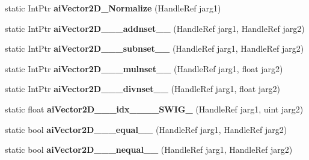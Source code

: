 \begin{DoxyCompactItemize}
\item 
\hypertarget{class_assimp_p_i_n_v_o_k_e_a921e98db8a531252fbb506358869beec}{static Int\+Ptr {\bfseries ai\+Vector2\+D\+\_\+\+Normalize} (Handle\+Ref jarg1)}\label{class_assimp_p_i_n_v_o_k_e_a921e98db8a531252fbb506358869beec}

\item 
\hypertarget{class_assimp_p_i_n_v_o_k_e_a347e7406c1f1c98d45b0b2af2e3e05f1}{static Int\+Ptr {\bfseries ai\+Vector2\+D\+\_\+\+\_\+\+\_\+addnset\+\_\+\+\_\+} (Handle\+Ref jarg1, Handle\+Ref jarg2)}\label{class_assimp_p_i_n_v_o_k_e_a347e7406c1f1c98d45b0b2af2e3e05f1}

\item 
\hypertarget{class_assimp_p_i_n_v_o_k_e_a69be9a8f164752109556509a65fe8ef9}{static Int\+Ptr {\bfseries ai\+Vector2\+D\+\_\+\+\_\+\+\_\+subnset\+\_\+\+\_\+} (Handle\+Ref jarg1, Handle\+Ref jarg2)}\label{class_assimp_p_i_n_v_o_k_e_a69be9a8f164752109556509a65fe8ef9}

\item 
\hypertarget{class_assimp_p_i_n_v_o_k_e_aa0d6b2d94c76055c7ab5f18c5799209b}{static Int\+Ptr {\bfseries ai\+Vector2\+D\+\_\+\+\_\+\+\_\+mulnset\+\_\+\+\_\+} (Handle\+Ref jarg1, float jarg2)}\label{class_assimp_p_i_n_v_o_k_e_aa0d6b2d94c76055c7ab5f18c5799209b}

\item 
\hypertarget{class_assimp_p_i_n_v_o_k_e_a3b2bbec76775745b7782106c26bb8c3f}{static Int\+Ptr {\bfseries ai\+Vector2\+D\+\_\+\+\_\+\+\_\+divnset\+\_\+\+\_\+} (Handle\+Ref jarg1, float jarg2)}\label{class_assimp_p_i_n_v_o_k_e_a3b2bbec76775745b7782106c26bb8c3f}

\item 
\hypertarget{class_assimp_p_i_n_v_o_k_e_a908e11d070af2f4b0b25f9d36e893bad}{static float {\bfseries ai\+Vector2\+D\+\_\+\+\_\+\+\_\+idx\+\_\+\+\_\+\+\_\+\+\_\+\+S\+W\+I\+G\+\_} (Handle\+Ref jarg1, uint jarg2)}\label{class_assimp_p_i_n_v_o_k_e_a908e11d070af2f4b0b25f9d36e893bad}

\item 
\hypertarget{class_assimp_p_i_n_v_o_k_e_a2267ba813e90881f491b09f82f3739c0}{static bool {\bfseries ai\+Vector2\+D\+\_\+\+\_\+\+\_\+equal\+\_\+\+\_\+} (Handle\+Ref jarg1, Handle\+Ref jarg2)}\label{class_assimp_p_i_n_v_o_k_e_a2267ba813e90881f491b09f82f3739c0}

\item 
\hypertarget{class_assimp_p_i_n_v_o_k_e_a16e61ee12d16353ecce42d960aca0989}{static bool {\bfseries ai\+Vector2\+D\+\_\+\+\_\+\+\_\+nequal\+\_\+\+\_\+} (Handle\+Ref jarg1, Handle\+Ref jarg2)}\label{class_assimp_p_i_n_v_o_k_e_a16e61ee12d16353ecce42d960aca0989}


\end{DoxyCompactItemize}
